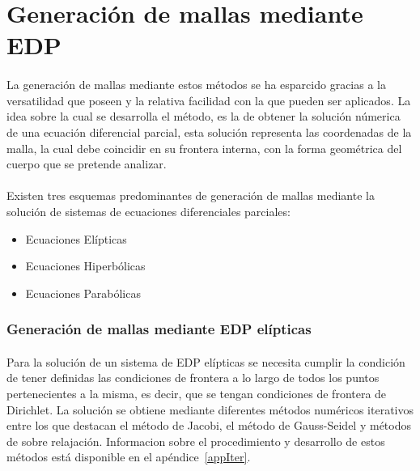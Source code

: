 \documentclass[letterpaper, openright, 12pt]{book}
\begin{document}
\section{Generación de mallas mediante EDP}
    \paragraph*{}
        La generación de mallas mediante estos métodos se ha esparcido gracias a
        la versatilidad que poseen y la relativa facilidad con la que pueden ser
        aplicados. La idea sobre la cual se desarrolla el método, es la de
        obtener la solución númerica de una ecuación diferencial parcial, esta
        solución representa las coordenadas de la malla, la cual debe coincidir
        en su frontera interna, con la forma geométrica del cuerpo que se
        pretende analizar.\cite{siladicParabolic}

    \paragraph*{}
        Existen tres esquemas predominantes de generación de mallas mediante la
        solución de sistemas de ecuaciones diferenciales parciales:
        \begin{itemize}
            \item Ecuaciones Elípticas
            \item Ecuaciones Hiperbólicas
            \item Ecuaciones Parabólicas
        \end{itemize}

    \subsubsection{Generación de mallas mediante EDP elípticas}
    \paragraph*{}
        Para la solución de un sistema de EDP elípticas se necesita cumplir la
        condición de tener definidas las condiciones de frontera a lo largo de
        todos los puntos pertenecientes a la misma, es decir, que se tengan
        condiciones de frontera de Dirichlet.
        La solución se obtiene mediante diferentes métodos numéricos iterativos
        entre los que destacan el método de Jacobi, el método de Gauss-Seidel y
        métodos de sobre relajación. Informacion sobre el procedimiento y
        desarrollo de estos métodos está disponible en el apéndice~\ref{appIter}.
\end{document}
